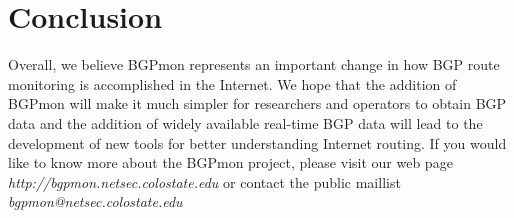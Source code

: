 \section{Conclusion}
\label{sec:conclude}

Overall, we believe BGPmon represents an important change in how BGP route monitoring is accomplished in the Internet. We hope that the addition of BGPmon will make it much simpler for researchers and operators to obtain BGP data and the addition of widely available real-time BGP data will lead to the development of new tools for better understanding Internet routing. If you would like to know more about the BGPmon project, please visit our web page \emph{http://bgpmon.netsec.colostate.edu} or contact the public maillist \emph{bgpmon@netsec.colostate.edu}
